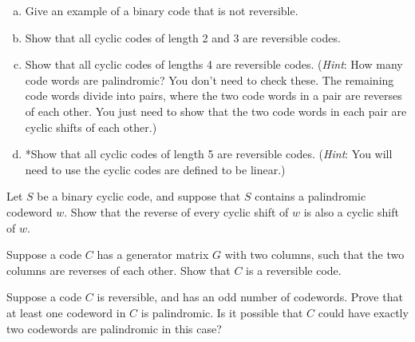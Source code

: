 \begin{exercise}{}
\begin{enumerate}[(a)]
\item
Give an example of a binary code that is not reversible.
\item
Show that all cyclic codes of length 2 and 3 are reversible codes.
\item
Show that all cyclic codes of lengths 4 are  reversible codes. (\emph{Hint}: How many code words are palindromic? You don't need to check these.  The remaining code words divide into pairs, where the two code words in a pair are reverses of each other. You just need to show that the two code words in each pair are cyclic shifts of each other.) 
\item
*Show that all cyclic codes of length 5 are  reversible codes. (\emph{Hint}:  You will need to use the cyclic codes are defined to be linear.)
\end{enumerate}
\end{exercise}

\begin{exercise}{}
Let $S$ be a binary cyclic code, and suppose that $S$ contains a palindromic codeword $w$. Show that the reverse of every cyclic shift of $w$ is also a cyclic shift of $w$.
\end{exercise}

\begin{exercise}{}
Suppose a code $C$ has a generator matrix $G$ with two columns, such that the two columns are reverses of each other. Show that $C$ is a reversible code.
\end{exercise}

\begin{exercise}{}
Suppose a code $C$ is reversible, and has an odd number of codewords. Prove that at least one codeword in $C$ is palindromic.  Is it possible that $C$ could have exactly two codewords are palindromic in this case?  
\end{exercise}



